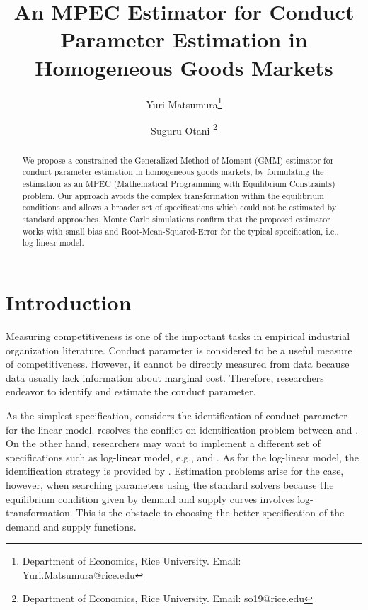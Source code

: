 \documentclass[11pt, a4paper]{article}
\title{An MPEC Estimator for Conduct Parameter Estimation in Homogeneous Goods Markets}
\author{Yuri Matsumura\thanks{Department of Economics, Rice University. Email: Yuri.Matsumura@rice.edu} \and Suguru Otani \thanks{Department of Economics, Rice University. Email: so19@rice.edu
}}
\begin{document}
\maketitle
\begin{abstract}
    We propose a constrained the Generalized Method of Moment (GMM) estimator for conduct parameter estimation in homogeneous goods markets, by formulating the estimation as an MPEC (Mathematical Programming with Equilibrium Constraints) problem. Our approach avoids the complex transformation within the equilibrium conditions and allows a broader set of specifications which could not be estimated by standard approaches. Monte Carlo simulations confirm that the proposed estimator works with small bias and Root-Mean-Squared-Error for the typical specification, i.e., log-linear model. %
\end{abstract}


\section{Introduction}
Measuring competitiveness is one of the important tasks in empirical industrial organization literature.
Conduct parameter is considered to be a useful measure of competitiveness. 
However, it cannot be directly measured from data because data usually lack information about marginal cost.
Therefore, researchers endeavor to identify and estimate the conduct parameter.

As the simplest specification, \citet{bresnahan1982oligopoly} considers the identification of conduct parameter for the linear model. \cite{matsumura2023revisiting} resolves the conflict on identification problem between \cite{bresnahan1982oligopoly} and \cite{perloff2012collinearity}. 
On the other hand, researchers may want to implement a different set of specifications such as log-linear model, e.g., \cite{okazaki2022excess} and \cite{merel2009measuring}. As for the log-linear model, the identification strategy is provided by \citet{lau1982identifying}. 
Estimation problems arise for the case, however, when searching parameters using the standard solvers because the equilibrium condition given by demand and supply curves involves log-transformation. 
This is the obstacle to choosing the better specification of the demand and supply functions.
\end{document}
